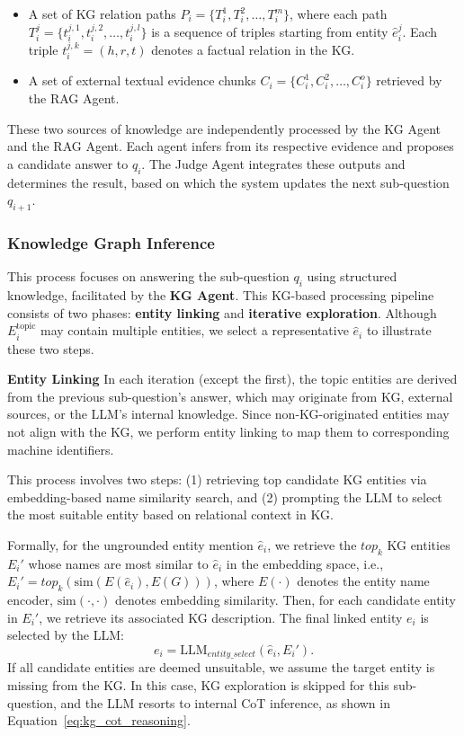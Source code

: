 \begin{itemize}
    \item A set of KG relation paths $P_i = \{T_i^1, T_i^2, \dots, T_i^m\}$, where each path $T_i^j = \{t_i^{j,1}, t_i^{j,2}, \dots, t_i^{j,l}\}$ is a sequence of triples starting from entity $\hat{e}_i^j$. Each triple $t_i^{j,k} = (h, r, t)$ denotes a factual relation in the KG.

    \item A set of external textual evidence chunks $C_i = \{C_i^1, C_i^2, \dots, C_i^o\}$ retrieved by the RAG Agent.
\end{itemize}


These two sources of knowledge are independently processed by the KG Agent and the RAG Agent. Each agent infers from its respective evidence and proposes a candidate answer to $q_i$. The Judge Agent integrates these outputs and determines the result, based on which the system updates the next sub-question $q_{i+1}$.

\subsubsection{Knowledge Graph Inference}

This process focuses on answering the sub-question $q_i$ using structured knowledge, facilitated by the \textbf{KG Agent}. This KG-based processing pipeline consists of two phases: \textbf{entity linking} and \textbf{iterative exploration}. Although $E_i^{\text{topic}}$ may contain multiple entities, we select a representative $\hat{e}_i$ to illustrate these two steps.


\textbf{Entity Linking} In each iteration (except the first), the topic entities are derived from the previous sub-question’s answer, which may originate from KG, external sources, or the LLM's internal knowledge. Since non-KG-originated entities may not align with the KG, we perform entity linking to map them to corresponding machine identifiers.

This process involves two steps: (1) retrieving top candidate KG entities via embedding-based name similarity search, and (2) prompting the LLM to select the most suitable entity based on relational context in KG.

Formally, for the ungrounded entity mention $\hat{e}_i$, we retrieve the $top_k$ KG entities $E_i'$ whose names are most similar to $\hat{e}_i$ in the embedding space, i.e., $E_i' = top_k(\text{sim}(E(\hat{e}_i), E(G)))$, where $E(\cdot)$ denotes the entity name encoder, $\text{sim}(\cdot, \cdot)$ denotes embedding similarity. Then, for each candidate entity in $E_i'$, we retrieve its associated KG description. The final linked entity $e_i$ is selected by the LLM:
\begin{equation}
e_i = \text{LLM}_{entity\_select}(\hat{e}_i, E_i').
\end{equation}
If all candidate entities are deemed unsuitable, we assume the target entity is missing from the KG. In this case, KG exploration is skipped for this sub-question, and the LLM resorts to internal CoT inference, as shown in Equation~\ref{eq:kg_cot_reasoning}.

